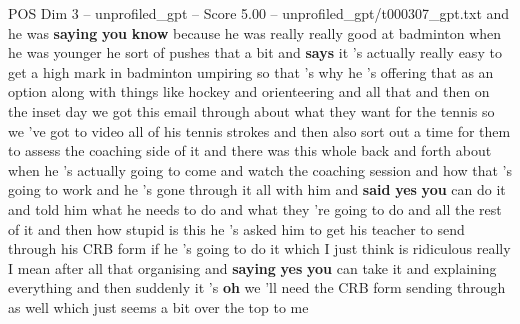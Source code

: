 \begin{textsample}{POS Dim 3 – unprofiled\_gpt – Score 5.00 – unprofiled\_gpt/t000307\_gpt.txt}  \label{ex:f3_pos_037}
and he was \textbf{saying} \textbf{you} \textbf{know} because he was really really good at badminton when he was younger he sort of pushes that a bit and \textbf{says} it ’s actually really easy to get a high mark in badminton umpiring so that ’s why he ’s offering that as an option along with things like hockey and orienteering and all that and then on the inset day we got this email through about what they want for the tennis so we ’ve got to video all of his tennis strokes and then also sort out a time for them to assess the coaching side of it and there was this whole back and forth about when he ’s actually going to come and watch the coaching session and how that ’s going to work and he ’s gone through it all with him and \textbf{said} \textbf{yes} \textbf{you} can do it and told him what he needs to do and what they ’re going to do and all the rest of it and then how stupid is this he ’s asked him to get his teacher to send through his CRB form if he ’s going to do it which I just think is ridiculous really I mean after all that organising and \textbf{saying} \textbf{yes} \textbf{you} can take it and explaining everything and then suddenly it ’s \textbf{oh} we ’ll need the CRB form sending through as well which just seems a bit over the top to me

\end{textsample}
